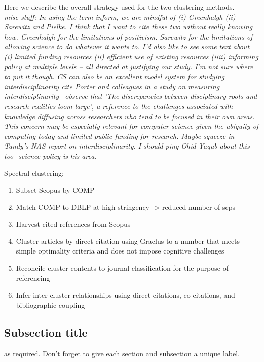 Here we describe the overall strategy used for the two clustering methods.\\

\emph{misc stuff:  In using the term inform, we are mindful of (i) Greenhalgh (ii) Sarewitz and Pielke. I think that I want to cite these two without really knowing how. Greenhalgh for the limitations of positivism. Sarewitz for the limitations of allowing science to do whatever it wants to. I'd also like to see some text about (i) limited funding resources (ii) efficient use of existing resources (iiii) informing policy at multiple levels -- all directed at justifying our study. I'm not sure where to put it though. CS can also be an excellent model system for studying interdisciplinarity cite Porter and colleagues in a study on measuring interdisciplinarity~\cite{porter_measuring_2007} observe that 'The discrepancies between disciplinary roots and research realities loom large', a reference to the challenges associated with knowledge diffusing across researchers who tend to be focused in their own areas. This concern may be especially relevant for computer science given the ubiquity of computing today and limited public funding for research. Maybe squeeze in Tandy's NAS report on interdisciplinarity. I should ping Ohid Yaqub about this too- science policy is his area.}


\noindent
 Spectral clustering:
\begin{enumerate}
\item Subset Scopus by COMP
\item Match COMP to DBLP at high stringency -> reduced number of scps
 \item Harvest cited references  from Scopus
 \item Cluster articles by direct citation using Graclus to a number that meets simple optimality criteria and does not impose cognitive challenges
 \item Reconcile cluster contents to journal classification for the purpose of referencing
 \item Infer inter-cluster relationships using direct citations, co-citations, and bibliographic coupling
\end{enumerate}





\subsection{Subsection title}
\label{sec:2}
as required. Don't forget to give each section
and subsection a unique label.
